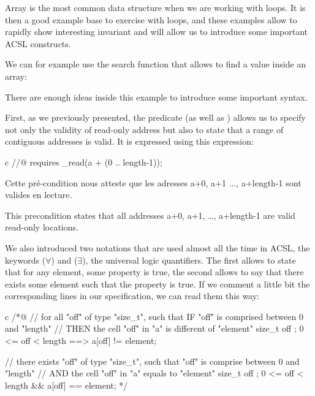 

Array is the most common data structure when we are working with loops.
It is then a good example base to exercise with loops, and these
examples allow to rapidly show interesting invariant and will allow us
to introduce some important ACSL constructs.



We can for example use the search function that allows to find a value
inside an array:





There are enough ideas inside this example to introduce some important
syntax.



First, as we previously presented, the
 predicate (as well as
) allows us to specify not only the
validity of read-only address but also to state that a range of
contiguous addresses is valid. It is expressed using this expression:



\begin{CodeBlock}{c}
//@ requires \valid_read(a + (0 .. length-1));
\end{CodeBlock}



Cette pré-condition nous atteste que les adresses a+0, a+1 ..., a+length-1 sont
valides en lecture.



This precondition states that all addresses a+0, a+1, \ldots{},
a+length-1 are valid read-only locations.

We also introduced two notations that are used almost all the time in
ACSL, the keywords  ($\forall$) and
 ($\exists$), the universal logic
quantifiers. The first allows to state that for any element, some
property is true, the second allows to say that there exists some
element such that the property is true. If we comment a little bit the
corresponding lines in our specification, we can read them this way:


\begin{CodeBlock}{c}
/*@
// for all "off" of type "size_t", such that IF "off" is comprised between 0 and "length"
//                                 THEN the cell "off" in "a" is different of "element"
\forall size_t off ; 0 <= off < length ==> a[off] != element;

// there exists "off" of type "size_t", such that "off" is comprise between 0 and "length"
//                                      AND the cell "off" in "a" equals to "element"
\exists size_t off ; 0 <= off < length && a[off] == element;
*/
\end{CodeBlock}



